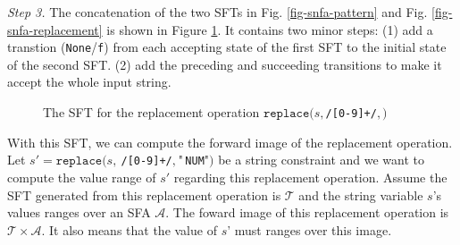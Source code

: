 \documentclass[a4paper,UKenglish,cleveref, autoref, thm-restate]{lipics-v2021}
\begin{document}
\noindent\emph{Step 3.}
The concatenation of the two SFTs in Fig. \ref{fig-snfa-pattern} and Fig. \ref{fig-snfa-replacement} is shown in Figure \ref{fig-rearranged-automata}. It contains two minor steps: (1) add a transtion (\texttt{None}/\texttt{f}) from each accepting state of the first SFT to the initial state of the second SFT. (2) add the preceding and succeeding transitions to make it accept the whole input string.

\begin{figure}[h] \centering
  \caption{The SFT for the replacement operation $\texttt{replace}(s, $\texttt{/[0-9]+/}$, $$)$}
  \label{fig-rearranged-automata}
  \end{figure}

  With this SFT, we can compute the forward image of the replacement operation.
  Let $s' = \texttt{replace}(s,~$\texttt{/[0-9]+/}$,~\text{"}$\texttt{NUM}$\text{"})$ be a string constraint and we want to compute the value range of $s'$ regarding this replacement operation.
  Assume the SFT generated from this replacement operation is $\mathcal{T}$ and the string variable $s$'s values ranges over an SFA $\mathcal{A}$. The foward image of this replacement operation is $\mathcal{T}\times \mathcal{A}$. It also means that the value of $s$' must ranges over this image.
\end{document}
